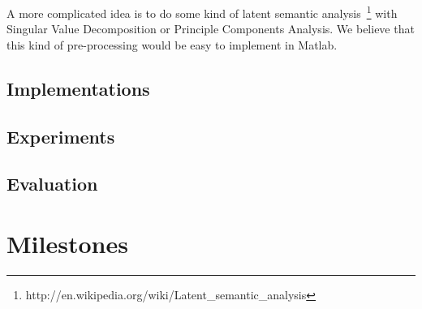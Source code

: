 \documentclass[10pt]{article}
\begin{document}
A more complicated idea is to do some kind of latent semantic analysis~\footnote{http://en.wikipedia.org/wiki/Latent\_semantic\_analysis} with Singular Value Decomposition or Principle Components Analysis. We believe that this kind of pre-processing would be easy to implement in Matlab.

\subsection{Implementations}


\subsection{Experiments}

\subsection{Evaluation}


\section{Milestones}
\end{document}
